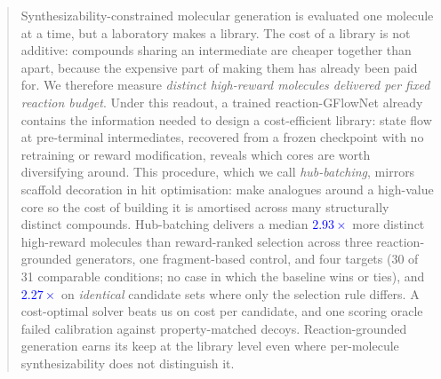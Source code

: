 \documentclass{article}
\newcommand{\checkval}[1]{\textcolor{blue}{#1}}
\begin{document}
\begin{abstract}

Synthesizability-constrained molecular generation is evaluated one molecule at a time, but a laboratory makes a library. The cost of a library is not additive: compounds sharing an intermediate are cheaper together than apart, because the expensive part of making them has already been paid for. We therefore measure \emph{distinct high-reward molecules delivered per fixed reaction budget}. Under this readout, a trained reaction-GFlowNet already contains the information needed to design a cost-efficient library: state flow at pre-terminal intermediates, recovered from a frozen checkpoint with no retraining or reward modification, reveals which cores are worth diversifying around. This procedure, which we call \emph{hub-batching}, mirrors scaffold decoration in hit optimisation: make analogues around a high-value core so the cost of building it is amortised across many structurally distinct compounds. Hub-batching delivers a median \checkval{$2.93\times$} more distinct high-reward molecules than reward-ranked selection across three reaction-grounded generators, one fragment-based control, and four targets (30 of 31 comparable conditions; no case in which the baseline wins or ties), and \checkval{$2.27\times$} on \emph{identical} candidate sets where only the selection rule differs. A cost-optimal solver beats us on cost per candidate, and one scoring oracle failed calibration against property-matched decoys. Reaction-grounded generation earns its keep at the library level even where per-molecule synthesizability does not distinguish it.
\end{abstract}

\end{document}
